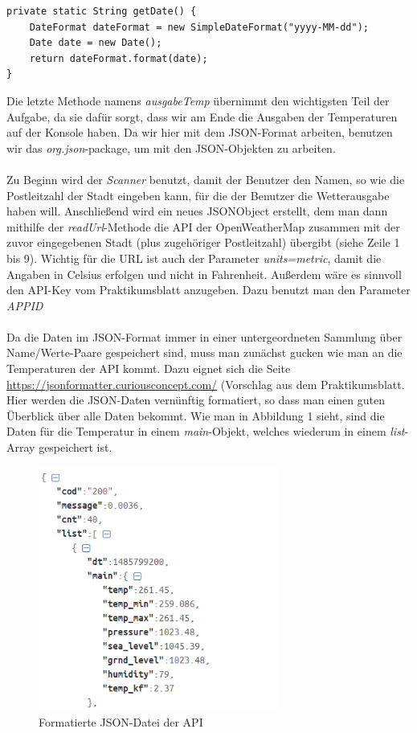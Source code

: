\begin{lstlisting}[caption={getDate-Methode}]
private static String getDate() {
	DateFormat dateFormat = new SimpleDateFormat("yyyy-MM-dd");
	Date date = new Date();
	return dateFormat.format(date);
}
\end{lstlisting}

Die letzte Methode namens \textit{ausgabeTemp} übernimmt den wichtigsten Teil der Aufgabe, da sie dafür sorgt, dass wir am Ende die Ausgaben der Temperaturen auf der Konsole haben. Da wir hier mit dem JSON-Format arbeiten, benutzen wir das \textit{org.json}-package, um mit den JSON-Objekten zu arbeiten.\cite{[2]} \\
\\
Zu Beginn wird der \textit{Scanner} benutzt, damit der Benutzer den Namen, so wie die Postleitzahl der Stadt eingeben kann, für die der Benutzer die Wetterausgabe haben will. Anschließend wird ein neues JSONObject erstellt, dem man dann mithilfe der \textit{readUrl}-Methode die API der OpenWeatherMap zusammen mit der zuvor eingegebenen Stadt (plus zugehöriger Postleitzahl) übergibt (siehe Zeile 1 bis 9). Wichtig für die URL ist auch der Parameter \textit{units=metric}, damit die Angaben in Celsius erfolgen und nicht in Fahrenheit. Außerdem wäre es sinnvoll den API-Key vom Praktikumsblatt anzugeben. Dazu benutzt man den Parameter \textit{APPID}\\
\\
Da die Daten im JSON-Format immer in einer untergeordneten Sammlung über Name/Werte-Paare gespeichert sind, muss man zunächst gucken wie man an die Temperaturen der API kommt. Dazu eignet sich die Seite \url{https://jsonformatter.curiousconcept.com/} (Vorschlag aus dem Praktikumsblatt. Hier werden die JSON-Daten vernünftig formatiert, so dass man einen guten Überblick über alle Daten bekommt. Wie man in Abbildung 1 sieht, sind die Daten für die Temperatur in einem \textit{main}-Objekt, welches wiederum in einem \textit{list}-Array gespeichert ist. 

\begin{figure}[htbp]
\begin{center}
\includegraphics[width=0.7\textwidth]{Bild1}
\caption{Formatierte JSON-Datei der API}
\end{center}
\end{figure}

